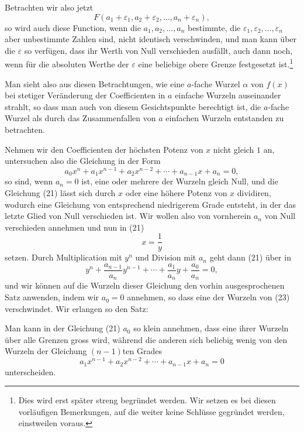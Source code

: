\documentclass[11pt]{article}
\begin{document}
Betrachten wir also jetzt
\[
 F(a_1+\varepsilon_1,a_2+\varepsilon_2,
\ldots,a_n+\varepsilon_n),
\]
so wird auch diese Function, wenn die $a_1,a_2,
\ldots,a_n$ bestimmte, die $\varepsilon_1,\varepsilon_2,
\ldots,\varepsilon_n$ aber unbestimmte Zahlen sind, nicht identisch verschwinden, und man kann über die $\varepsilon$ so verfügen, dass ihr Werth von Null verschieden ausfällt, auch dann noch, wenn für die absoluten Werthe der $\varepsilon$ eine beliebige obere Grenze festgesetzt ist.\footnote{Dies wird erst später streng begründet werden. Wir setzen es bei diesen vorläufigen Bemerkungen, auf die weiter keine Schlüsse gegründet werden, einstweilen voraus.}

Man sieht also aus diesen Betrachtungen, wie eine $a$-fache Wurzel $\alpha$ von $f(x)$ bei stetiger Veränderung der Coefficienten in $a$ einfache Wurzeln auseinander strahlt, so dass man auch von diesem Gesichtspunkte berechtigt ist, die $a$-fache Wurzel als durch das Zusammenfallen von $a$ einfachen Wurzeln entstanden zu betrachten.

Nehmen wir den Coefficienten der höchsten Potenz von $x$ nicht gleich $1$ an, untersuchen also die Gleichung in der Form
\begin{equation}
 a_0x^n+a_1x^{n-1}+a_2x^{n-2}+\cdots+a_{n-1}x+a_n=0,
\tag{21}
\end{equation}
so sind, wenn $a_n=0$ ist, eine oder mehrere der Wurzeln gleich Null, und die Gleichung (21) lässt sich durch $x$ oder eine höhere Potenz von $x$ dividiren, wodurch eine Gleichung von entsprechend niedrigerem Grade entsteht, in der das letzte Glied von Null verschieden ist. Wir wollen also von vornherein $a_n$ von Null verschieden annehmen und nun in (21)
\begin{equation}
 x=\frac1y
\tag{22}
\end{equation}
setzen. Durch Multiplication mit $y^n$ und Division mit $a_n$ geht dann (21) über in
\begin{equation}
 y^n+\frac{a_{n-1}}{a_n}y^{n-1}+\cdots+\frac{a_1}{a_n}y+\frac{a_0}{a_n}=0,
\tag{23}
\end{equation}
und wir können auf die Wurzeln dieser Gleichung den vorhin ausgesprochenen Satz anwenden, indem wir $a_0=0$ annehmen, so dass eine der Wurzeln von (23) verschwindet. Wir erlangen so den Satz:

Man kann in der Gleichung (21) $a_0$ so klein annehmen, dass eine ihrer Wurzeln über alle Grenzen gross wird, während die anderen sich beliebig wenig von den Wurzeln der Gleichung $(n-1)$ten Grades
\[
 a_1x^{n-1}+a_2x^{n-2}+\cdots+a_{n-1}x+a_n=0
\]
unterscheiden.
\end{document}
